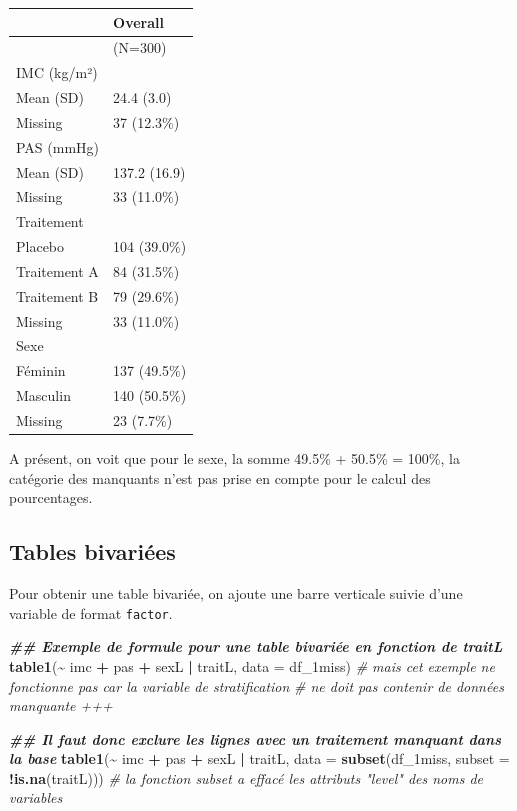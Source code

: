 \documentclass[
]{book}
\newenvironment{Shaded}{\begin{snugshade}}{\end{snugshade}}
\newcommand{\AttributeTok}[1]{\textcolor[rgb]{0.13,0.29,0.53}{#1}}
\newcommand{\CommentTok}[1]{\textcolor[rgb]{0.56,0.35,0.01}{\textit{#1}}}
\newcommand{\DocumentationTok}[1]{\textcolor[rgb]{0.56,0.35,0.01}{\textbf{\textit{#1}}}}
\newcommand{\FunctionTok}[1]{\textcolor[rgb]{0.13,0.29,0.53}{\textbf{#1}}}
\newcommand{\NormalTok}[1]{#1}
\newcommand{\SpecialCharTok}[1]{\textcolor[rgb]{0.81,0.36,0.00}{\textbf{#1}}}
\begin{document}
\begin{tabular}{ll}
\toprule
  & Overall\\
\midrule
 & (N=300)\\
IMC (kg/m²) & \\
Mean (SD) & 24.4 (3.0)\\
Missing & 37 (12.3\%)\\
PAS (mmHg) & \\
\addlinespace
Mean (SD) & 137.2 (16.9)\\
Missing & 33 (11.0\%)\\
Traitement & \\
Placebo & 104 (39.0\%)\\
Traitement A & 84 (31.5\%)\\
\addlinespace
Traitement B & 79 (29.6\%)\\
Missing & 33 (11.0\%)\\
Sexe & \\
Féminin & 137 (49.5\%)\\
Masculin & 140 (50.5\%)\\
\addlinespace
Missing & 23 (7.7\%)\\
\bottomrule
\end{tabular}

A présent, on voit que pour le sexe, la somme 49.5\% + 50.5\% = 100\%, la catégorie des manquants n'est pas prise en compte pour le calcul des pourcentages.

\subsection{Tables bivariées}\label{tables-bivariuxe9es}

Pour obtenir une table bivariée, on ajoute une barre verticale suivie d'une variable de format \texttt{factor}.

\begin{Shaded}
\begin{Highlighting}[]
\DocumentationTok{\#\# Exemple de formule pour une table bivariée en fonction de traitL}
\FunctionTok{table1}\NormalTok{(}\SpecialCharTok{\textasciitilde{}}\NormalTok{ imc }\SpecialCharTok{+}\NormalTok{ pas }\SpecialCharTok{+}\NormalTok{ sexL }\SpecialCharTok{|}\NormalTok{ traitL, }\AttributeTok{data =}\NormalTok{ df\_1miss)}
\CommentTok{\# mais cet exemple ne fonctionne pas car la variable de stratification }
\CommentTok{\# ne doit pas contenir de données manquante +++}

\DocumentationTok{\#\# Il faut donc exclure les lignes avec un traitement manquant dans la base}
\FunctionTok{table1}\NormalTok{(}\SpecialCharTok{\textasciitilde{}}\NormalTok{ imc }\SpecialCharTok{+}\NormalTok{ pas }\SpecialCharTok{+}\NormalTok{ sexL }\SpecialCharTok{|}\NormalTok{ traitL, }
       \AttributeTok{data =} \FunctionTok{subset}\NormalTok{(df\_1miss, }\AttributeTok{subset =} \SpecialCharTok{!}\FunctionTok{is.na}\NormalTok{(traitL))) }
\CommentTok{\# la fonction subset a effacé les attributs "level" des noms de variables}
\end{Highlighting}
\end{Shaded}
\end{document}
